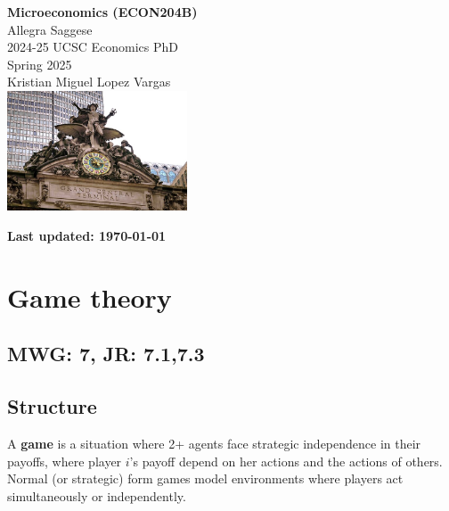 \documentclass{article}
\begin{document}
\begin{titlepage}
    \centering
    \vspace{1in} %
    {\LARGE \textbf{Microeconomics (ECON204B)}} \\[0.5cm]
    {\LARGE Allegra Saggese} \\ [.5cm]
    {\large 2024-25 UCSC Economics PhD} \\ [1.5 cm]
    {\large Spring 2025} \\[.25cm]
    {\large Kristian Miguel Lopez Vargas} \\[1cm]
    \includegraphics[width=0.4\textwidth]{images/gst-cover.jpg} 
    \vfill
\end{titlepage}


\clearpage
\pagestyle{empty} %
\noindent \textbf{Last updated: \today} 
\vspace{0.5cm} %
\tableofcontents
\clearpage %
\pagestyle{plain} %




\section{Game theory}
\subsection*{MWG: 7, JR: 7.1,7.3}
\subsection{Structure}

A \textbf{game} is a situation where 2+ agents face strategic independence in their payoffs, where player $i$'s payoff depend on her actions and the actions of others. Normal (or strategic) form games model environments where players act simultaneously or independently. \\
\end{document}
